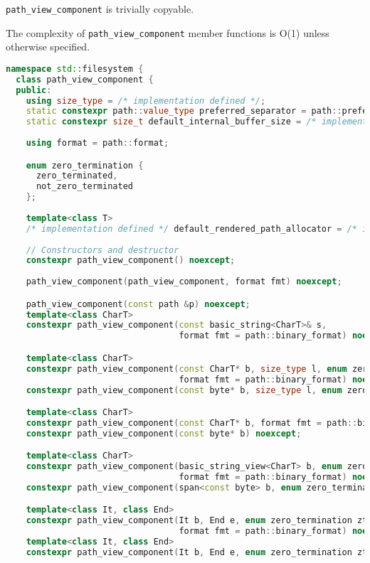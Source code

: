 \documentclass[11pt]{article}
\newcommand{\code}[2][cpp]{\lstinline[language=#1,basicstyle=\small\ttfamily]{#2}}
\begin{document}
\code{path_view_component} is trivially copyable.

The complexity of \code{path_view_component} member functions is O(1) unless otherwise specified.

\begin{lstlisting}[language=cpp]
namespace std::filesystem {
  class path_view_component {
  public:
    using size_type = /* implementation defined */;
    static constexpr path::value_type preferred_separator = path::preferred_separator;
    static constexpr size_t default_internal_buffer_size = /* implementation defined */;
    
    using format = path::format;

    enum zero_termination {
      zero_terminated,
      not_zero_terminated
    };
    
    template<class T>
    /* implementation defined */ default_rendered_path_allocator = /* implementation defined */;
    
    // Constructors and destructor
    constexpr path_view_component() noexcept;
    
    path_view_component(path_view_component, format fmt) noexcept;

    path_view_component(const path &p) noexcept;
    template<class CharT>
    constexpr path_view_component(const basic_string<CharT>& s,
                                  format fmt = path::binary_format) noexcept;

    template<class CharT>
    constexpr path_view_component(const CharT* b, size_type l, enum zero_termination zt,
                                  format fmt = path::binary_format) noexcept;
    constexpr path_view_component(const byte* b, size_type l, enum zero_termination zt) noexcept;

    template<class CharT>
    constexpr path_view_component(const CharT* b, format fmt = path::binary_format) noexcept;
    constexpr path_view_component(const byte* b) noexcept;

    template<class CharT>
    constexpr path_view_component(basic_string_view<CharT> b, enum zero_termination zt,
                                  format fmt = path::binary_format) noexcept;
    constexpr path_view_component(span<const byte> b, enum zero_termination zt) noexcept;

    template<class It, class End>
    constexpr path_view_component(It b, End e, enum zero_termination zt,
                                  format fmt = path::binary_format) noexcept;
    template<class It, class End>
    constexpr path_view_component(It b, End e, enum zero_termination zt) noexcept;


\end{lstlisting}
\end{document}

